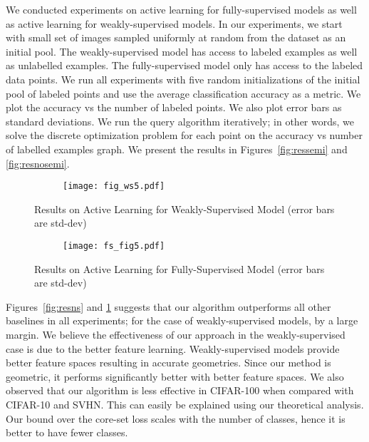 \documentclass{article} \usepackage{iclr2018_conference,times}
\begin{document}
We conducted experiments on active learning for fully-supervised models as well as active learning for weakly-supervised
models. In our experiments, we start with small set of images sampled uniformly at random from the dataset as an initial
pool. The weakly-supervised model has access to labeled examples as well as unlabelled examples. The fully-supervised
model only has access to the labeled data points. We run all experiments with five random initializations of the initial
pool of labeled points and use the average classification accuracy as a metric. We plot the accuracy vs the number of
labeled points. We also plot error bars as standard deviations. We run the query algorithm iteratively; in other
words, we solve the discrete optimization problem  for each point on the accuracy
vs number of labelled examples graph. We present the results in Figures~\ref{fig:ressemi} and \ref{fig:resnosemi}.

\begin{figure}[tb]
    \centering
    \begin{subfigure}[b]{\textwidth}
        \texttt{[image: fig\_ws5.pdf]}
    \end{subfigure}
    \vspace{-5mm}
    \caption{Results on Active Learning for Weakly-Supervised Model (error bars are std-dev)}\label{fig:ressemi}
        \vspace{-3mm}
    \label{fig:resns}
\vspace{5mm}
    \begin{subfigure}[b]{\textwidth}
        \texttt{[image: fs\_fig5.pdf]}
    \end{subfigure}
        \vspace{-5mm}
    \caption{Results on Active Learning for Fully-Supervised Model (error bars are std-dev)}\label{fig:resnosemi}
        \vspace{-5mm}
    \label{fig:ress}
\end{figure}

Figures~\ref{fig:resns} and \ref{fig:ress} suggests that our algorithm outperforms all other baselines in all
experiments; for the case of weakly-supervised models, by a large margin. We believe the effectiveness of our approach
in the weakly-supervised case is due to the better feature learning. Weakly-supervised models provide better feature
spaces resulting in accurate geometries. Since our method is geometric, it performs significantly better with better
feature spaces. We also observed that our algorithm is less effective in CIFAR-100 when compared with
CIFAR-10 and SVHN. This can easily be explained using our theoretical analysis. Our bound over the core-set loss scales with the
number of classes, hence it is better to have fewer classes.
\end{document}
